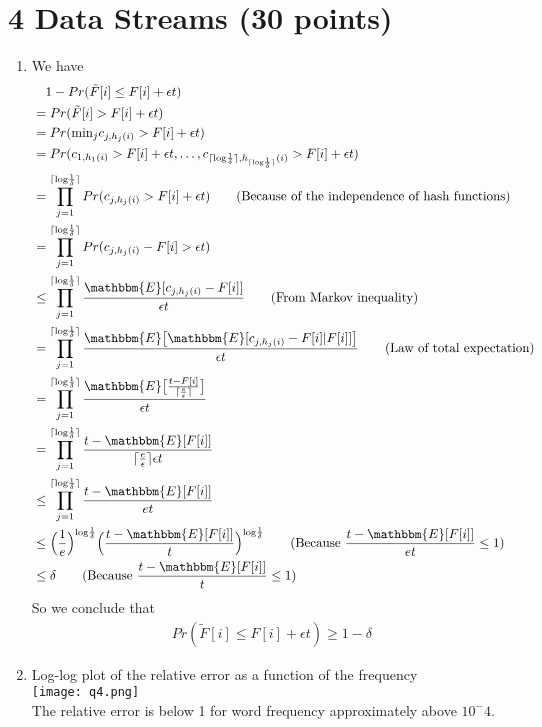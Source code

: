 \documentclass[12pt]{article}
\begin{document}
\section*{4 Data Streams (30 points)}
\begin{enumerate}[label=(\alph*)]
	\item
	We have
	\begin{align*}
		&\quad 1 - Pr(\tilde{F}[i]\leq F[i] + \epsilon t) \\
		&= Pr(\tilde{F}[i] > F[i] + \epsilon t) \\
		&= Pr(\text{min}_j{c_{j, h_j(i)}} > F[i] + \epsilon t) \\
		&= Pr(c_{1,h_1(i)} > F[i] + \epsilon t,\dots,c_{\lceil \text{log}\frac{1}{\delta}\rceil,h_{\lceil \text{log}\frac{1}{\delta}\rceil}(i)} > F[i] + \epsilon t) \\
		&= \prod_{j=1}^{\lceil \text{log}\frac{1}{\delta}\rceil}Pr(c_{j,h_j(i)} > F[i] + \epsilon t) \qquad \text{(Because of the independence of hash functions)} \\
		&= \prod_{j=1}^{\lceil \text{log}\frac{1}{\delta}\rceil}Pr(c_{j,h_j(i)} - F[i]> \epsilon t) \\
		&\leq \prod_{j=1}^{\lceil \text{log}\frac{1}{\delta}\rceil} \frac{\mathbbm{E}[c_{j,h_j(i)} - F[i]]}{\epsilon t} \qquad \text{(From Markov inequality)} \\
		&= \prod_{j=1}^{\lceil \text{log}\frac{1}{\delta}\rceil} \frac{\mathbbm{E}\big[\mathbbm{E}[c_{j,h_j(i)} - F[i]|F[i]]\big]}{\epsilon t} \qquad \text{(Law of total expectation)} \\
		&= \prod_{j=1}^{\lceil \text{log}\frac{1}{\delta}\rceil} \frac{\mathbbm{E}\big[\frac{t - F[i]}{\lceil \frac{e}{\epsilon}\rceil}\big]}{\epsilon t} \\
		&= \prod_{j=1}^{\lceil \text{log}\frac{1}{\delta}\rceil} \frac{t - \mathbbm{E}[F[i]]}{\lceil \frac{e}{\epsilon}\rceil \epsilon t} \\
		&\leq \prod_{j=1}^{\lceil \text{log}\frac{1}{\delta}\rceil} \frac{t - \mathbbm{E}[F[i]]}{et} \\
		&\leq \Big(\frac{1}{e}\Big)^{\text{log}\frac{1}{\delta}}\Big(\frac{t - \mathbbm{E}[F[i]]}{t}\Big)^{\text{log}\frac{1}{\delta}} \qquad \text{(Because $\frac{t - \mathbbm{E}[F[i]]}{et} \leq 1$)} \\
		&\leq \delta \qquad \text{(Because $\frac{t - \mathbbm{E}[F[i]]}{t} \leq 1$)}
	\end{align*}
	So we conclude that 
	\begin{align*}
		Pr(\tilde{F}[i]\leq F[i] + \epsilon t) \geq 1 - \delta
	\end{align*}
	\item
	Log-log plot of the relative error as a function of the frequency \\
	\texttt{[image: q4.png]} \\
	The relative error is below 1 for word frequency approximately above $10^-4$.
\end{enumerate}
\end{document}
